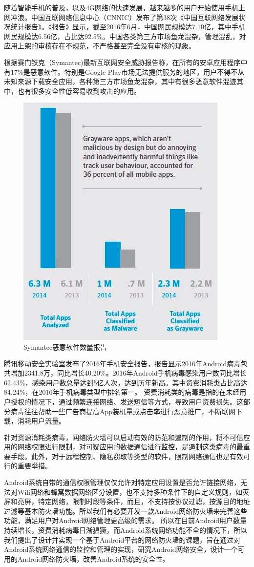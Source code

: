 \documentclass[format=final, language=chinese, degree=bachelor]{hustthesis}
\begin{document}
随着智能手机的普及，以及4G网络的快速发展，越来越多的用户开始使用手机上网冲浪。中国互联网络信息中心（CNNIC）发布了第38次《中国互联网络发展状况统计报告》。《报告》显示，截至2016年6月，中国网民规模达7.10亿，其中手机网民规模达6.56亿，占比达92.5\%。中国各类第三方市场鱼龙混杂，管理混乱，对应用上架的审核存在不规范，不严格甚至完全没有审核的现象。

根据赛门铁克（Symantec)最新互联网安全威胁报告称，在所有的安卓应用程序中有17\%是恶意软件。特别是Google Play市场无法提供服务的地区，用户不得不从未知来源下载安全应用，各种第三方市场鱼龙混杂，其中有很多恶意软件混迹其中，也有很多安全性低容易收到攻击的应用。

\begin{figure}[h!]
\centering
\includegraphics[width=.4\textwidth]{symantec_report}
\caption{Symantec恶意软件数量报告}\label{fig:2}
\end{figure}

腾讯移动安全实验室发布了2016年手机安全报告，报告显示2016年Android病毒包共增加2341.8万，同比增长40.20\%。2016年Android手机病毒感染用户数同比增长62.43\%，感染用户数总量达到5亿人次，达到历年新高。其中资费消耗类占比高达84.24\%，在2016年手机病毒类型中排名第一。
资费消耗类的病毒是指的在未经用户授权的情况下，通过频繁连接网络、发送短信等方式，导致用户资费损失。这部分病毒往往帮助一些广告商提高App装机量或点击率进行恶意推广，不断联网下载，消耗用户流量。

针对资源消耗类病毒，网络防火墙可以启动有效的防范和遏制的作用，将不可信应用的网络权限进行限制，对可疑应用的数据通信进行监控，是遏制这类病毒的最重要手段。此外，对于远程控制、隐私窃取等类型的软件，限制网络通信也是有效可行的重要举措。

Android系统自带的通信权限管理仅仅允许对特定应用设置是否允许链接网络，无法对Wifi网络和蜂窝数据网络区分设置，也不支持多种条件下的自定义规则，如灭屏和亮屏，特定网络，限制时段等条件，而且，不支持按协议过滤，按源目的地址过滤等基本防火墙功能。所以我们有必要开发一款Android网络防火墙来完善这些功能，满足用户对Android网络管理更高级的需求。
所以在目前Android用户数量持续增长，资费消耗病毒日渐猖獗，而Android系统网络功能不全的情况下，所以我们提出了设计并实现一个基于Android平台的网络防火墙的课题，旨在通过对Android系统网络通信的监控和管理的实现，研究Android网络安全，设计一个可用的Android网络防火墙，改善Android系统的安全性。
\end{document}
